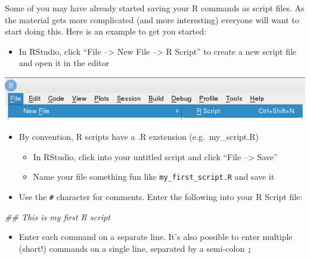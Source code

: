 \documentclass[]{book}
\newenvironment{Shaded}{\begin{snugshade}}{\end{snugshade}}
\newcommand{\CommentTok}[1]{\textcolor[rgb]{0.56,0.35,0.01}{\textit{#1}}}
\newcommand{\KeywordTok}[1]{\textcolor[rgb]{0.13,0.29,0.53}{\textbf{#1}}}
\newcommand{\NormalTok}[1]{#1}
\newcommand{\StringTok}[1]{\textcolor[rgb]{0.31,0.60,0.02}{#1}}
\providecommand{\tightlist}{%
  \setlength{\itemsep}{0pt}\setlength{\parskip}{0pt}}
\begin{document}
Some of you may have already started saving your R commands as script files. As the material gets more complicated (and more interesting) everyone will want to start doing this. Here is an example to get you started:

\begin{itemize}
\tightlist
\item
  In RStudio, click ``File --\textgreater{} New File --\textgreater{} R Script'' to create a new script file and open it in the editor
\end{itemize}

\begin{center}\includegraphics[width=0.6\linewidth]{images/rstudio_new_rscript_file} \end{center}

\begin{itemize}
\tightlist
\item
  By convention, R scripts have a .R exstension (e.g.~my\_script.R)

  \begin{itemize}
  \tightlist
  \item
    In RStudio, click into your untitled script and click ``File --\textgreater{} Save''
  \item
    Name your file something fun like \texttt{my\_first\_script.R} and save it
  \end{itemize}
\item
  Use the \texttt{\#} character for comments. Enter the following into your R Script file:
\end{itemize}

\begin{Shaded}
\begin{Highlighting}[]
\CommentTok{## This is my first R script}
\end{Highlighting}
\end{Shaded}

\begin{itemize}
\tightlist
\item
  Enter each command on a separate line. It's also possible to enter multiple (short!) commands on a single line, separated by a semi-colon \texttt{;}
\end{itemize}

\begin{Shaded}
\end{Shaded}
\end{document}
